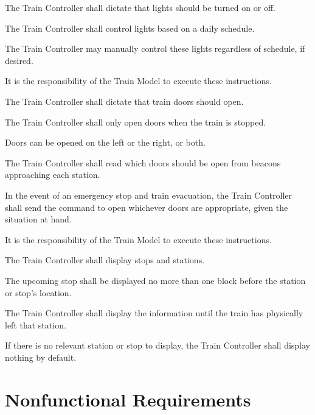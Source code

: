 \documentclass{scrreprt}
\begin{document}
\begin{numonly}
    \item The Train Controller shall dictate that lights should be turned on or off.
    \begin{numonly}
        \item The Train Controller shall control lights based on a daily schedule.
        \item The Train Controller may manually control these lights regardless of schedule, if desired.
        \item It is the responsibility of the Train Model to execute these instructions.
    \end{numonly}

    \item The Train Controller shall dictate that train doors should open.
    \begin{numonly}
        \item The Train Controller shall only open doors when the train is stopped.
        \item Doors can be opened on the left or the right, or both.
        \item The Train Controller shall read which doors should be open from beacons approaching each station.
        \item In the event of an emergency stop and train evacuation, the Train Controller shall send the command to open whichever doors are appropriate, given the situation at hand.
        \item It is the responsibility of the Train Model to execute these instructions.
    \end{numonly}

    \item The Train Controller shall display stops and stations.
    \begin{numonly}
        \item The upcoming stop shall be displayed no more than one block before the station or stop's location.
        \item The Train Controller shall display the information until the train has physically left that station.
        \item If there is no relevant station or stop to display, the Train Controller shall display nothing by default.
    \end{numonly}
\end{numonly}

\section{Nonfunctional Requirements}
\end{document}
